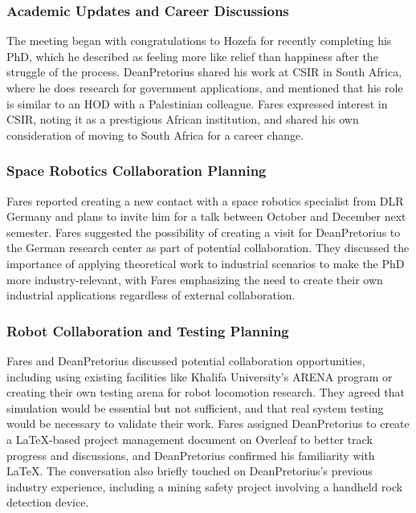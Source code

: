 \subsubsection{Academic Updates and Career Discussions}

The meeting began with congratulations to Hozefa for recently completing his PhD, which he described as feeling more like relief than happiness after the struggle of the process. DeanPretorius shared his work at CSIR in South Africa, where he does research for government applications, and mentioned that his role is similar to an HOD with a Palestinian colleague. Fares expressed interest in CSIR, noting it as a prestigious African institution, and shared his own consideration of moving to South Africa for a career change.

\subsubsection{Space Robotics Collaboration Planning}

Fares reported creating a new contact with a space robotics specialist from DLR Germany and plans to invite him for a talk between October and December next semester. Fares suggested the possibility of creating a visit for DeanPretorius to the German research center as part of potential collaboration. They discussed the importance of applying theoretical work to industrial scenarios to make the PhD more industry-relevant, with Fares emphasizing the need to create their own industrial applications regardless of external collaboration.

\subsubsection{Robot Collaboration and Testing Planning}

Fares and DeanPretorius discussed potential collaboration opportunities, including using existing facilities like Khalifa University's ARENA program or creating their own testing arena for robot locomotion research. They agreed that simulation would be essential but not sufficient, and that real system testing would be necessary to validate their work. Fares assigned DeanPretorius to create a LaTeX-based project management document on Overleaf to better track progress and discussions, and DeanPretorius confirmed his familiarity with LaTeX. The conversation also briefly touched on DeanPretorius's previous industry experience, including a mining safety project involving a handheld rock detection device.

